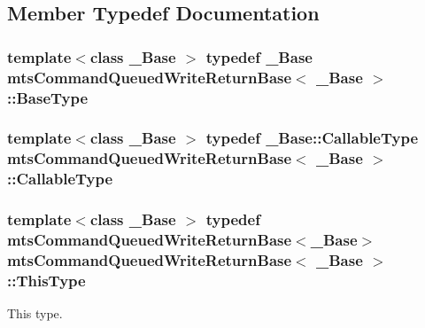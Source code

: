\subsection{Member Typedef Documentation}
\hypertarget{classmts_command_queued_write_return_base_a1c16e3d09d9bb0071bb50f31ba81b4a8}{}
\subsubsection[{Base\+Type}]{\setlength{\rightskip}{0pt plus 5cm}template$<$class \+\_\+\+Base $>$ typedef \+\_\+\+Base {\bf mts\+Command\+Queued\+Write\+Return\+Base}$<$ \+\_\+\+Base $>$\+::{\bf Base\+Type}}\label{classmts_command_queued_write_return_base_a1c16e3d09d9bb0071bb50f31ba81b4a8}
\hypertarget{classmts_command_queued_write_return_base_aa8635b9bab77a8e15f53f9f80415c420}{}
\subsubsection[{Callable\+Type}]{\setlength{\rightskip}{0pt plus 5cm}template$<$class \+\_\+\+Base $>$ typedef \+\_\+\+Base\+::\+Callable\+Type {\bf mts\+Command\+Queued\+Write\+Return\+Base}$<$ \+\_\+\+Base $>$\+::{\bf Callable\+Type}}\label{classmts_command_queued_write_return_base_aa8635b9bab77a8e15f53f9f80415c420}
\hypertarget{classmts_command_queued_write_return_base_af2f07528dc98cd88ab385e995f95a368}{}
\subsubsection[{This\+Type}]{\setlength{\rightskip}{0pt plus 5cm}template$<$class \+\_\+\+Base $>$ typedef {\bf mts\+Command\+Queued\+Write\+Return\+Base}$<$\+\_\+\+Base$>$ {\bf mts\+Command\+Queued\+Write\+Return\+Base}$<$ \+\_\+\+Base $>$\+::{\bf This\+Type}}\label{classmts_command_queued_write_return_base_af2f07528dc98cd88ab385e995f95a368}
This type. 

